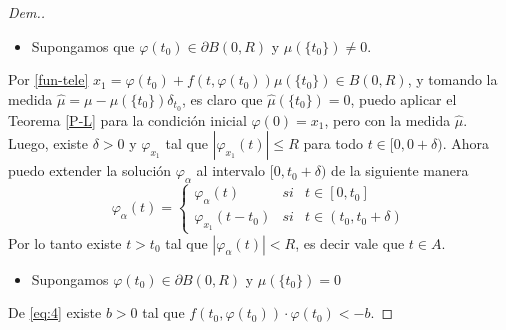 \begin{proof}[Dem.]
    
    \begin{itemize}
        
    
    \item Supongamos que  $\varphi(t_0)\in \partial B(0,R)$ y $\mu(\{t_0\})\neq 0$.
    
    \end{itemize}
Por \eqref{fun-tele}  $x_1=\varphi(t_0)+f(t,\varphi(t_0))\mu(\{t_0\})\in B(0,R)$, y tomando la medida $\hat{\mu}=\mu-\mu(\{t_0\})\delta_{t_0}$, es claro que $\hat{\mu}(\{t_0\})=0$, puedo aplicar el Teorema \ref{P-L} para la condición inicial $\varphi(0)=x_1$, pero con la medida $\hat{\mu}$.  Luego, existe $\delta>0$  y $\varphi_{x_1}$ tal que $|\varphi_{x_1}(t)|\leq R$ para todo $t\in [0,0+\delta)$. Ahora puedo extender la solución $\varphi_\alpha$ al intervalo $[0,t_0+\delta)$  de la siguiente manera
$$\varphi_\alpha(t)=\left\{\begin{array}{ccc}
    \varphi_\alpha(t) & si &  t\in[0,t_0]\\
     \varphi_{x_1}(t-t_0) & si &t\in(t_0,t_0+\delta) 
\end{array}\right.$$
Por lo tanto existe $t>t_0$ tal que $|\varphi_\alpha(t)|<R$, es decir vale que $t\in A$.



 		



    
\begin{itemize}
\item Supongamos $\varphi(t_0)\in \partial B(0,R)$ y $\mu(\{t_0\})= 0$ 
\end{itemize}
De \eqref{eq:4} existe $b>0$ tal que $f(t_0,\varphi(t_0))\cdot\varphi(t_0)<-b$.


\end{proof}
